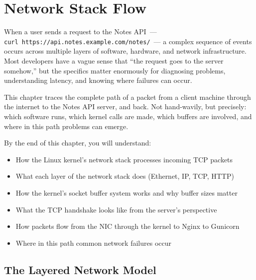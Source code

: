\setcounter{chapter}{25}
\chapter{Network Stack Flow}\label{ch:26-network-stack-flow}

\chapterrule

When a user sends a request to the Notes API~--- \texttt{curl\ https:}\allowbreak{}\texttt{/}\allowbreak{}\texttt{/}\allowbreak{}\texttt{api.}\allowbreak{}\texttt{notes.}\allowbreak{}\texttt{example.}\allowbreak{}\texttt{com/}\allowbreak{}\texttt{notes/}~--- a complex sequence of events occurs across multiple layers of software, hardware, and network infrastructure. Most developers have a vague sense that ``the request goes to the server somehow,'' but the specifics matter enormously for diagnosing problems, understanding latency, and knowing where failures can occur.

This chapter traces the complete path of a packet from a client machine through the internet to the Notes API server, and back. Not hand-wavily, but precisely: which software runs, which kernel calls are made, which buffers are involved, and where in this path problems can emerge.

\begin{objectives}

By the end of this chapter, you will understand:

\begin{itemize}
\tightlist
\item
  How the Linux kernel's network stack processes incoming TCP packets
\item
  What each layer of the network stack does (Ethernet, IP, TCP, HTTP)
\item
  How the kernel's socket buffer system works and why buffer sizes matter
\item
  What the TCP handshake looks like from the server's perspective
\item
  How packets flow from the NIC through the kernel to Nginx to Gunicorn
\item
  Where in this path common network failures occur
\end{itemize}

\end{objectives}

\setcounter{section}{0}
\section{The Layered Network Model}\label{26-network-stack-flow:261-the-layered-network-model}

